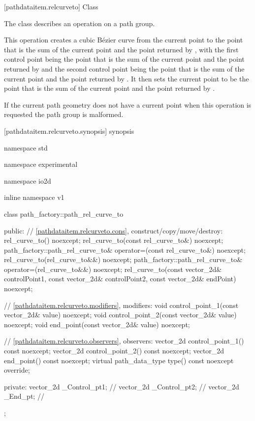  [pathdataitem.relcurveto] {Class }

\pnum
{}
The class  describes an operation on a path group.

\pnum
This operation creates a cubic B\'ezier curve from the current point to the point that is the sum of the current point and the point returned by , with the first control point being the point that is the sum of the current point and the point returned by  and the second control point being the point that is the sum of the current point and the point returned by . It then sets the current point to be the point that is the sum of the current point and the point returned by .

\pnum
If the current path geometry does not have a current point when this operation is requested the path group is malformed.

 [pathdataitem.relcurveto.synopsis] { synopsis}

\begin{codeblock}
namespace std { namespace experimental { namespace io2d { inline namespace v1 {
  class path_factory::path_rel_curve_to {
  public:
    // \ref{pathdataitem.relcurveto.cons}, construct/copy/move/destroy:
    rel_curve_to() noexcept;
    rel_curve_to(const rel_curve_to&) noexcept;
    path_factory::path_rel_curve_to& operator=(const rel_curve_to&) noexcept;
    rel_curve_to(rel_curve_to&&) noexcept;
    path_factory::path_rel_curve_to& operator=(rel_curve_to&&) noexcept;
    rel_curve_to(const vector_2d& controlPoint1, const vector_2d& controlPoint2,
      const vector_2d& endPoint) noexcept;

    // \ref{pathdataitem.relcurveto.modifiers}, modifiers:
    void control_point_1(const vector_2d& value) noexcept;
    void control_point_2(const vector_2d& value) noexcept;
    void end_point(const vector_2d& value) noexcept;

    // \ref{pathdataitem.relcurveto.observers}, observers:
    vector_2d control_point_1() const noexcept;
    vector_2d control_point_2() const noexcept;
    vector_2d end_point() const noexcept;
    virtual path_data_type type() const noexcept override;
    
  private:
    vector_2d _Control_pt1; // \expos
    vector_2d _Control_pt2; // \expos
    vector_2d _End_pt;      // \expos
  };
} } } }
\end{codeblock}


